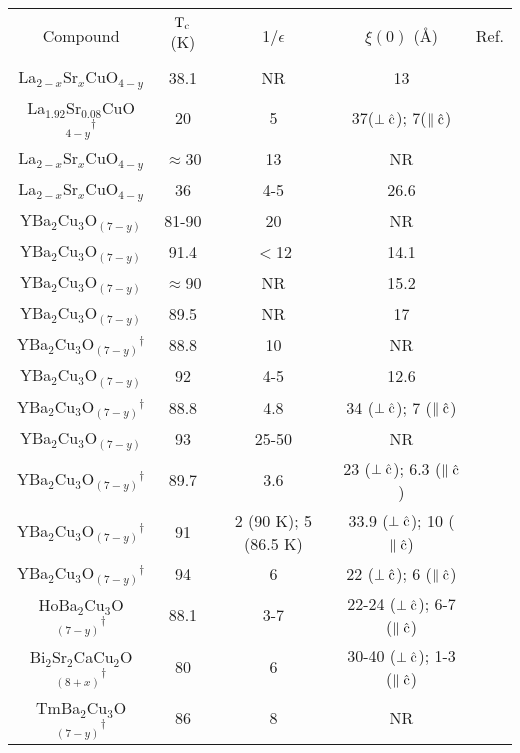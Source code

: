 {\newpage
\clearpage
\samepage \begin{table}\begin{center}

\label{hitctable}
\begin{tabular}{|ccccc|}
\hline
& & & & \\ 
Compound& $\rm T_c$ (K)& 1/$\epsilon$ & $\xi(0)$ (\AA)& Ref. \\ 
& & & & \\ 
\hline
%
La$_{2-x}$Sr$_x$CuO$_{4-y}$ & 38.1 & NR & 13 & \cite{orlando87b}\\ 
La$_{1.92}$Sr$_{0.08}$CuO$_{4-y}$$^{\dagger}$ & 20  & 5 & 37($\rm \perp \hat{c}$); 7($\rm \parallel \hat{c}$) & \cite{iye88}\\ 
La$_{2-x}$Sr$_x$CuO$_{4-y}$ & $\approx$30 & 13 & NR  & \cite{uchida87}\\ 
La$_{2-x}$Sr$_x$CuO$_{4-y}$ & 36 & 4-5 & 26.6 & \cite{vanbentum87}\\ 
YBa$_2$Cu$_3$O$_{(7-y)}$ & 81-90 & 20 & NR & \cite{mcguire87}\\ 
YBa$_2$Cu$_3$O$_{(7-y)}$ & 91.4 & $<$12 & 14.1 & \cite{orlando87}\\ 
YBa$_2$Cu$_3$O$_{(7-y)}$ & $\approx$90 & NR & 15.2 & \cite{rettori87}\\ 
YBa$_2$Cu$_3$O$_{(7-y)}$ & 89.5 & NR & 17 & \cite{orlando87a}\\ 
YBa$_2$Cu$_3$O$_{(7-y)}$$^{\dagger}$ & 88.8 &10  & NR & \cite{dinger87}\\ 
YBa$_2$Cu$_3$O$_{(7-y)}$ & 92 & 4-5 & 12.6 & \cite{vanbentum87}\\ 
YBa$_2$Cu$_3$O$_{(7-y)}$$^{\dagger}$ & 88.8 & 4.8 &34 ($\rm \perp \hat{c}$); 7 ($\rm \parallel \hat{c}$)  & \cite{worthington87}\\  
YBa$_2$Cu$_3$O$_{(7-y)}$ & 93 & 25-50 & NR & \cite{welch87}\\ 
YBa$_2$Cu$_3$O$_{(7-y)}$$^{\dagger}$ & 89.7 & 3.6 & 23 ($\rm \perp \hat{c}$); 6.3 ($\rm \parallel \hat{c}$)  & \cite{moodera88}\\  
YBa$_2$Cu$_3$O$_{(7-y)}$$^{\dagger}$ & 91 & 2 (90 K); 5 (86.5 K) & 33.9 ($\rm \perp \hat{c}$); 10 ($\rm \parallel \hat{c}$)  & \cite{iye87}\\  
YBa$_2$Cu$_3$O$_{(7-y)}$$^{\dagger}$ & 94 & 6 & 22 ($\rm \perp \hat{c}$); 6 ($\rm \parallel \hat{c}$)  & \cite{sakakibara87}\\  
HoBa$_2$Cu$_3$O$_{(7-y)}$$^{\dagger}$ & 88.1 & 3-7 & 22-24 ($\rm \perp \hat{c}$); 6-7 ($\rm \parallel \hat{c}$)  & \cite{iye87a}\\  
Bi$_2$Sr$_2$CaCu$_2$O$_{(8+x)}$$^{\dagger}$ & 80 & 6 &30-40 ($\rm \perp \hat{c}$); 1-3 ($\rm \parallel \hat{c}$)  & \cite{iye88}\\  
%
TmBa$_2$Cu$_3$O$_{(7-y)}$$^{\dagger}$ & 86 & 8 &NR & \cite{noel87}\\ 
\hline
\end{tabular}
\end{center}
\end{table}
}


